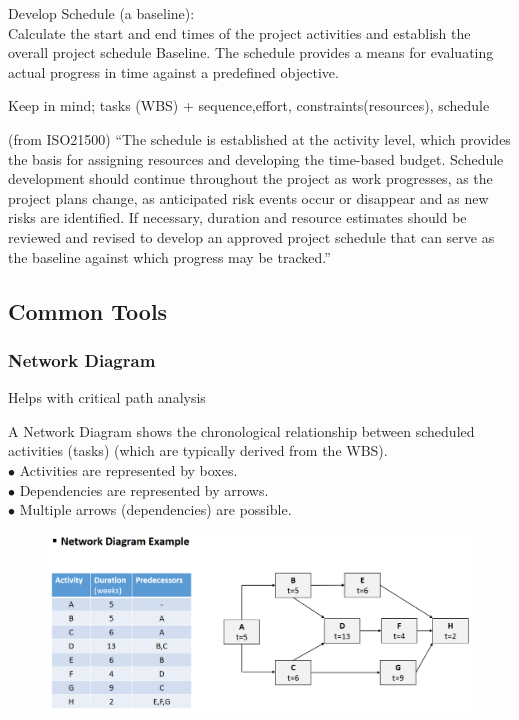 \documentclass[]{project_plan}
\newcommand{\bulletPoint}{\hspace{-3.1pt}$\bullet$ \hspace{5pt}}
\begin{document}
Develop Schedule (a baseline):\\
Calculate the start and end times of the project activities and establish the overall
project schedule Baseline. The schedule provides a means for evaluating actual progress
in time against a predefined objective.

Keep in mind; tasks (WBS) + sequence,effort, constraints(resources), schedule

(from ISO21500) “The schedule is established at the activity level, which provides the basis for
assigning resources and developing the time-based budget. Schedule development should
continue throughout the project as work progresses, as the project plans change, as
anticipated risk events occur or disappear and as new risks are identified. If necessary,
duration and resource estimates should be reviewed and revised to develop an approved
project schedule that can serve as the baseline against which progress may be tracked.”

\subsection{Common Tools}

\subsubsection{Network Diagram}
Helps with critical path analysis

A Network Diagram shows the chronological relationship between scheduled
activities (tasks) (which are typically derived from the WBS).\\
\bulletPoint Activities are represented by boxes.\\
\bulletPoint Dependencies are represented by arrows.\\
\bulletPoint Multiple arrows (dependencies) are possible.

\begin{figure}[h!]
  \centering
  \includegraphics[width=\linewidth]{network_diagram_example.png}
\end{figure}
\end{document}
